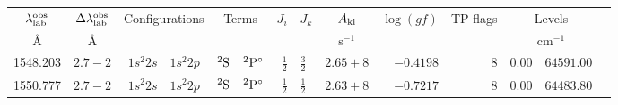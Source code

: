 \begin{table*}
\begin{tabular}{rrr@{ -- }lr@{ -- }lr@{ -- }llrrr@{ -- }rl}
\hline
\multicolumn{1}{c}{$\lambda_{\rm lab}^{\rm obs}$} & \multicolumn{1}{c}{$\Delta\lambda_{\rm lab}^{\rm obs}$} & \multicolumn{2}{c}{Configurations} & \multicolumn{2}{c}{Terms} & $J_i$ & $J_k$ & \multicolumn{1}{c}{$A_{\rm ki}$} & \multicolumn{1}{c}{$\log(gf)$} & TP flags & \multicolumn{2}{c}{Levels}  \\
\multicolumn{1}{c}{\AA } & \multicolumn{1}{c}{\AA} & \multicolumn{2}{c}{} & \multicolumn{2}{c}{} & \multicolumn{2}{c}{} & \multicolumn{1}{c}{s$^{-1}$} & & & \multicolumn{2}{c}{cm$^{-1}$} & \\
\hline
   1548.203  & $2.7-2$ &  $1s^{2}2s$ & $1s^{2}2p$  &       $^{2}{\rm S}$ & $^{2}{\rm P}^\circ$ &  $\frac{1}{2}$ & $\frac{3}{2}$  & $2.65+8$ & $ -0.4198$ &     8 &      $0.00$ &  $64591.00$  \\
   1550.777  & $2.7-2$ &  $1s^{2}2s$ & $1s^{2}2p$  &       $^{2}{\rm S}$ & $^{2}{\rm P}^\circ$ &  $\frac{1}{2}$ & $\frac{1}{2}$  & $2.63+8$ & $ -0.7217$ &     8 &      $0.00$ &  $64483.80$  \\
\hline
\end{tabular}
\label{tab:civ_configs}
\end{table*}
